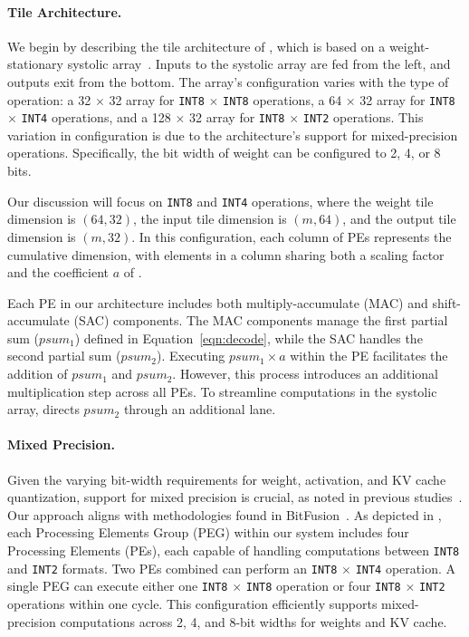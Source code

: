 \paragraph{Tile Architecture.}
We begin by describing the tile architecture of \proj, which is based on a weight-stationary systolic array~\cite{jouppi2023tpu}. Inputs to the systolic array are fed from the left, and outputs exit from the bottom. 
The array's configuration varies with the type of operation: a 32 $\times$ 32 array for \texttt{INT8} $\times$ \texttt{INT8} operations, a 64 $\times$ 32 array for \texttt{INT8} $\times$ \texttt{INT4} operations, and a 128 $\times$ 32 array for \texttt{INT8} $\times$ \texttt{INT2} operations. 
This variation in configuration is due to the architecture's support for mixed-precision operations.
Specifically, the bit width of weight can be configured to 2, 4, or 8 bits.


Our discussion will focus on \texttt{INT8} and \texttt{INT4} operations, where the weight tile dimension is $(64, 32)$, the input tile dimension is $(m, 64)$, and the output tile dimension is $(m, 32)$. In this configuration, each column of PEs represents the cumulative dimension, with elements in a column sharing both a scaling factor and the coefficient $a$ of \proj.


Each PE in our architecture includes both multiply-accumulate (MAC) and shift-accumulate (SAC) components. The MAC components manage the first partial sum ($psum_1$) defined in Equation~\eqref{eqn:decode}, while the SAC handles the second partial sum ($psum_2$). Executing $psum_1 \times a$ within the PE facilitates the addition of $psum_1$ and $psum_2$. However, this process introduces an additional multiplication step across all PEs. To streamline computations in the systolic array, \proj directs $psum_2$ through an additional lane.



\paragraph{Mixed Precision.}
Given the varying bit-width requirements for weight, activation, and KV cache quantization, support for mixed precision is crucial, as noted in previous studies~\cite{guo2022ant,guo2023olive,song2020drq,zheng2022dota,zhou2016dorefa,micikevicius2018mixed,cai2020zeroq,cai2020rethinking,Reggiani2023mixgemm}. Our approach aligns with methodologies found in BitFusion~\cite{sharma2018bit}. As depicted in , each Processing Elements Group (PEG) within our system includes four Processing Elements (PEs), each capable of handling computations between \texttt{INT8} and \texttt{INT2} formats. Two PEs combined can perform an \texttt{INT8} $\times$ \texttt{INT4} operation. A single
PEG can execute either one \texttt{INT8} $\times$ \texttt{INT8} operation or four \texttt{INT8} $\times$ \texttt{INT2} operations within one cycle. This configuration efficiently supports mixed-precision computations across 2, 4, and 8-bit widths for weights and KV cache.


